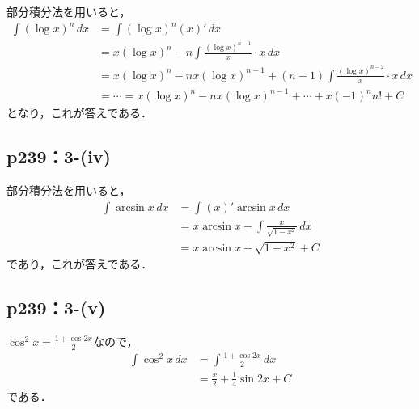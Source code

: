 \documentclass[a4paper,10pt,fleqn]{ltjsarticle}
\begin{document}
\begin{tleftbar}
    部分積分法を用いると，
    \begin{align*}
        \int (\log x)^n \, dx & = \int (\log x)^n  (x)' \, dx                                                           \\
                              & = x (\log x)^n - n \int  \frac{(\log x)^{n-1}}{x} \cdot  x \, dx                        \\
                              & =  x (\log x)^n - n x(\log x)^{n-1} + (n-1) \int \frac{(\log x)^{n-2}}{x} \cdot x \, dx \\
                              & = \cdots = x (\log x)^n - n x(\log x)^{n-1} + \cdots + x(-1)^n n!+C
    \end{align*}
    となり，これが答えである．
\end{tleftbar}

\subsection*{p239：3-(iv)}
\begin{leftbar}
    部分積分法を用いると，
    \begin{align*}
        \int \arcsin x \, dx & = \int (x)' \arcsin x \, dx                        \\
                             & = x \arcsin x  - \int \frac{x}{\sqrt{1-x^2}} \, dx \\
                             & = x \arcsin x + \sqrt{1-x^2} + C
    \end{align*}
    であり，これが答えである．
\end{leftbar}

\subsection*{p239：3-(v)}

\begin{tleftbar}
    $\cos ^2 x = \frac{1+\cos 2x}{2}$なので，
    \begin{align*}
        \int \cos ^2 x \, dx & = \int \frac{1+\cos 2x}{2} \, dx      \\
                             & = \frac{x}{2}+\frac{1}{4} \sin 2x + C
    \end{align*}
    である．
\end{tleftbar}
\end{document}

